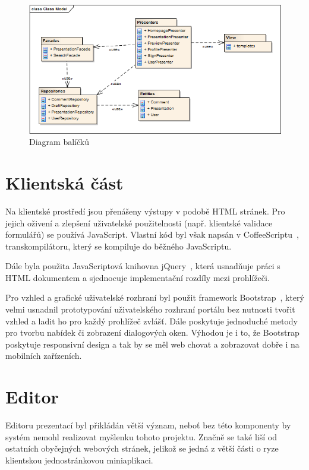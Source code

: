 \documentclass[11pt,twoside,a4paper]{book}
\begin{document}
\begin{figure}[ht]
	\begin{center}
		\includegraphics[width=14cm]{PRO-img/balicky.png}
		\caption{Diagram balíčků}
		\label{fig:balicky}
	\end{center}
\end{figure}


\section{Klientská část}
Na klientské prostředí jsou přenášeny výstupy v podobě HTML stránek. Pro jejich oživení a zlepšení uživatelské použitelnosti (např. klientské validace formulářů) se používá JavaScript. Vlastní kód byl však napsán v CoffeeScriptu~\cite{coffee}, transkompilátoru, který se kompiluje do běžného JavaScriptu. 

Dále byla použita JavaScriptová knihovna jQuery~\cite{jQuery}, která usnadňuje práci s HTML dokumentem a sjednocuje implementační rozdíly mezi prohlížeči.

Pro vzhled a grafické uživatelské rozhraní byl použit framework Bootstrap~\cite{bootstrap}, který velmi usnadnil prototypování uživatelského rozhraní portálu bez nutnosti tvořit vzhled a ladit ho pro každý prohlížeč zvlášť. Dále poskytuje jednoduché metody pro tvorbu nabídek či zobrazení dialogových oken. Výhodou je i to, že Bootstrap poskytuje responsivní design a tak by se měl web chovat a zobrazovat dobře i na mobilních zařízeních.


\section{Editor}
Editoru prezentací byl přikládán větší význam, neboť bez této komponenty by systém nemohl realizovat myšlenku tohoto projektu. Značně se také liší od ostatních obyčejných webových stránek, jelikož se jedná z větší části o ryze klientskou jednostránkovou miniaplikaci.
\end{document}
